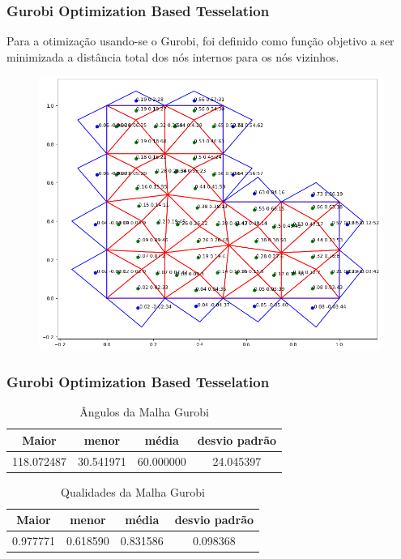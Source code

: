\documentclass[brazil]{beamer}
\begin{document}
\begin{frame}
  \frametitle{Gurobi Optimization Based Tesselation}

  Para a otimização usando-se o Gurobi, foi definido como função objetivo a ser minimizada a distância total dos nós internos para os nós vizinhos.

  \begin{figure}
    \includegraphics[width=0.6\linewidth]{fig/malha-gurobi.png}
  \end{figure}

\end{frame}
\begin{frame}
  \frametitle{Gurobi Optimization Based Tesselation}

  \begin{table}[hb]
    \centering
    \par\caption{Ângulos da Malha Gurobi}
    \begin{tabular}{c|c|c|c}
      Maior      & menor     & média     & desvio padrão \\\hline\hline
      118.072487	&30.541971&60.000000&24.045397\\\hline
    \end{tabular}
    \label{tab:angulos-malha-gurobi}
  \end{table}

  \begin{table}[hb]
    \centering
    \par\caption{Qualidades da Malha Gurobi}
    \begin{tabular}{c|c|c|c}
      Maior    & menor    & média    & desvio padrão \\\hline\hline
      0.977771&0.618590&0.831586&0.098368\\\hline
    \end{tabular}
    \label{tab:qualidades-malha-gurobi}
  \end{table}

\end{frame}
\end{document}
